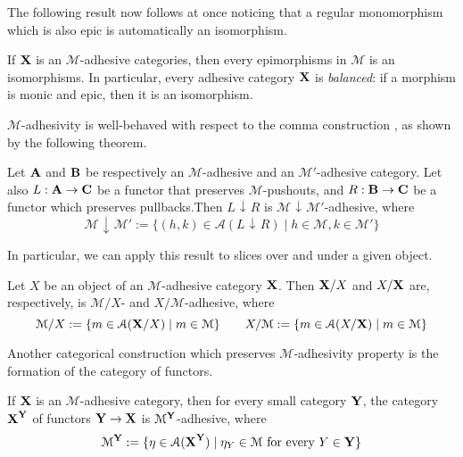 \documentclass[a4paper,UKenglish,cleveref,pdftex, thm-restate,numberwithinsect]{lipics}
\def\A{\textbf {\textup{A}}}
\def\B{\textbf {\textup{B}}}
\def\C{\textbf {\textup{C}}}
\def\X{\textbf {\textup{X}}}
\def\Y{\textbf {\textup{Y}}}
\newcommand{\comma}[2]{#1\hspace{1pt} {\downarrow}\hspace{1pt} #2}
\newcommand{\cma}[2]{\mathcal{#1}\hspace{1pt} {\downarrow}\hspace{1pt} \mathcal{#2}}
\begin{document}
The following result now follows at once noticing that a regular monomorphism which is also epic is automatically an isomorphism.

\begin{corollary}\label{prop:bal}
If $\X$ is an $\mathcal{M}$-adhesive categories, then every epimorphisms in $\mathcal{M}$ is an isomorphisms. In particular, every adhesive category $\X$ is \emph{balanced}: if a morphism is monic and epic, then it is an isomorphism.
\end{corollary}


$\mathcal{M}$-adhesivity is well-behaved with respect to  the comma construction \cite{mac2013categories}, as shown by the following theorem.
\begin{theorem}\label{lem:comma}
	Let $\A$ and $\B$ be respectively an $\mathcal{M}$-adhesive and an $\mathcal{M}'$-adhesive category. Let also $L:\A\rightarrow \C$ be a functor that preserves $\mathcal{M}$-pushouts, and  $R:\B\rightarrow \C$ be a functor which preserves pullbacks.Then $\comma{L}{R}$ is $\cma{M}{M'}$-adhesive, where 
	\[
	\cma{M}{M}':=\{(h,k)\in \mathcal{A}(\comma{L}{R}) \mid h\in \mathcal{M}, k\in \mathcal{M}'\}\]
\end{theorem}

In particular, we can apply this result to slices over and under a given object.

\begin{corollary}\label{cor:slice}
	Let  $X$ be an object of an $\mathcal{M}$-adhesive category $\X$. Then  $\X/X$ and $X/\X$ are, respectively, is $\mathcal{M}/X$- and $X/\mathcal{M}$-adhesive, where
	\[\mathcal{M}/X:=\{m\in  \mathcal{A}(\X/X) \mid m\in \mathcal{M} \} \qquad X/\mathcal{M}:=\{m\in  \mathcal{A}(X/\X) \mid m\in \mathcal{M} \}\]
\end{corollary}


Another categorical construction which preserves $\mathcal{M}$-adhesivity property is the formation of the category of functors.

\begin{theorem}\label{thm:functors}
If $\X$ is an $\mathcal{M}$-adhesive category, then for every small category $\Y$, the category $\X^\Y$  of functors $\Y\to \X$ is $\mathcal{M}^{\Y}$-adhesive, where
\[\mathcal{M}^{\Y}:=\{\eta \in \mathcal{A}(\X^\Y) \mid \eta_Y \in \mathcal{M} \text{ for every } Y\in \Y\}\]
\end{theorem}
\end{document}
